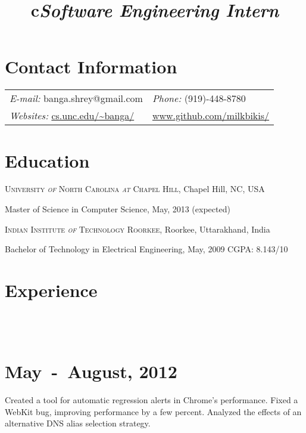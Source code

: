 \documentclass[margin,line]{res}
\newcommand{\datesection}[1]{\section{\textnormal{\scriptsize \textcolor{subtle}{#1}}}}
\newenvironment{list1}{
  \begin{list}{\ding{113}}{%
      \setlength{\itemsep}{0in}
      \setlength{\parsep}{0in} \setlength{\parskip}{0in}
      \setlength{\topsep}{0in} \setlength{\partopsep}{0in} 
      \setlength{\leftmargin}{0.17in}}}{\end{list}}
\begin{document}

\begin{resume}
\section{\sc Contact Information}
\vspace{.05in}
\begin{tabular}{@{}p{2in}p{4in}}
{\it E-mail:}  banga.shrey@gmail.com  & {\it Phone:}  (919)-448-8780 \\            
{\it Websites:} \url{cs.unc.edu/~banga/} & \url{www.github.com/milkbikis/} \\
\end{tabular}

\section{\sc Education}
\textsc{University \textit{of} North Carolina \textit{at} Chapel Hill}, Chapel Hill, NC, USA\\
\vspace*{-.1in}
\begin{list1}
\item[] Master of Science in Computer Science, May, 2013 (expected)
\end{list1}

\textsc{Indian Institute \textit{of} Technology Roorkee}, Roorkee, Uttarakhand, India\\
\vspace*{-.1in}
\begin{list1}
\item[] Bachelor of Technology in Electrical Engineering, May, 2009 \hfill {CGPA: 8.143/10}
\end{list1}

\section{\sc Experience}

\begin{format}
		\title{c}\\
		\body\\
\end{format}

\datesection{May~-~August, 2012}
\title{\em Software Engineering Intern}
\begin{position}
Created a tool for automatic regression alerts in Chrome's performance.
Fixed a WebKit bug, improving performance by a few percent.
Analyzed the effects of an alternative DNS alias selection strategy.
\end{position}


\end{resume}
\end{document}
